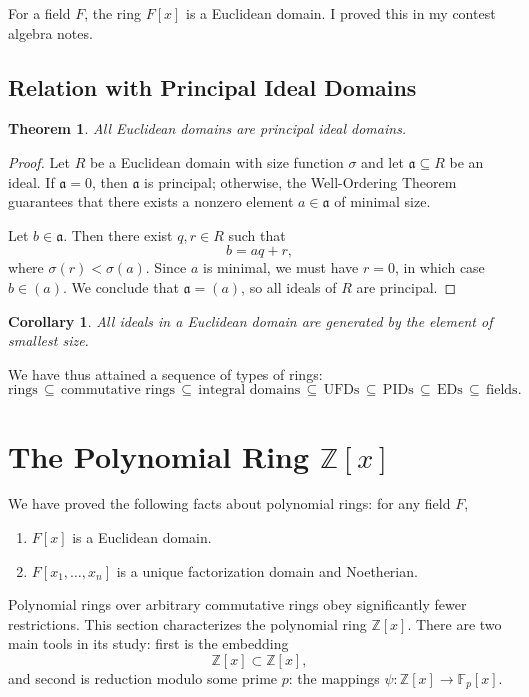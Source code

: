 \documentclass[11pt]{article}
\newtheorem{theorem}{Theorem}
\newtheorem{corollary}{Corollary}
\begin{document}
For a field $F$, the ring $F[x]$ is a Euclidean domain. I proved this in my contest algebra notes.


\subsection{Relation with Principal Ideal Domains}

\begin{adjustwidth}{0.5cm}{}
  \begin{theorem}
    All Euclidean domains are principal ideal domains.
  \end{theorem}
  \begin{proof}
    Let $R$ be a Euclidean domain with size function $\sigma$ and let $\mathfrak{a} \subseteq R$ be an ideal. If $\mathfrak{a} = 0$, then $\mathfrak{a}$ is principal; otherwise, the Well-Ordering Theorem guarantees that there exists a nonzero element $a \in \mathfrak{a}$ of minimal size.

    Let $b \in \mathfrak{a}$. Then there exist $q, r \in R$ such that
    \[
      b = aq + r,
    \]
    where $\sigma(r) < \sigma(a)$. Since $a$ is minimal, we must have $r = 0$, in which case $b \in (a)$. We conclude that $\mathfrak{a} = (a)$, so all ideals of $R$ are principal.
  \end{proof}
  \begin{corollary}
    All ideals in a Euclidean domain are generated by the element of smallest size.
  \end{corollary}
\end{adjustwidth}

We have thus attained a sequence of types of rings:
\[
  \text{rings} \, \subseteq \, \text{commutative rings} \, \subseteq \, \text{integral domains} \, \subseteq \, \text{UFDs} \, \subseteq \, \text{PIDs} \, \subseteq \, \text{EDs} \, \subseteq \, \text{fields}.
\]


\section{The Polynomial Ring \texorpdfstring{$\mathbb{Z}[x]$}{Z[x]}}

We have proved the following facts about polynomial rings: for any field $F$,
\begin{enumerate}
  \item $F[x]$ is a Euclidean domain.
  \item $F[x_{1}, \ldots, x_{n}]$ is a unique factorization domain and Noetherian.
\end{enumerate}
Polynomial rings over arbitrary commutative rings obey significantly fewer restrictions. This section characterizes the polynomial ring $\mathbb{Z}[x]$. There are two main tools in its study: first is the embedding
\[
  \mathbb{Z}[x] \subset \mathbb{Z}[x],
\]
and second is reduction modulo some prime $p$: the mappings $\psi : \mathbb{Z}[x] \to \mathbb{F}_{p}[x]$.
\end{document}
